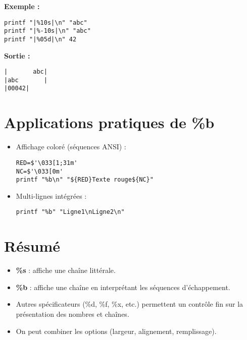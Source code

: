 \documentclass[11pt,a4paper]{article}
\begin{document}
\textbf{Exemple :}
\begin{lstlisting}
printf "|%10s|\n" "abc"
printf "|%-10s|\n" "abc"
printf "|%05d|\n" 42
\end{lstlisting}

\textbf{Sortie :}
\begin{verbatim}
|       abc|
|abc       |
|00042|
\end{verbatim}

\section*{Applications pratiques de \%b}
\begin{itemize}
  \item Affichage coloré (séquences ANSI) :
\begin{lstlisting}
RED=$'\033[1;31m'
NC=$'\033[0m'
printf "%b\n" "${RED}Texte rouge${NC}"
\end{lstlisting}

  \item Multi-lignes intégrées :
\begin{lstlisting}
printf "%b" "Ligne1\nLigne2\n"
\end{lstlisting}

\end{itemize}

\section*{Résumé}
\begin{itemize}
  \item \textbf{\%s} : affiche une chaîne littérale.
  \item \textbf{\%b} : affiche une chaîne en interprétant les séquences d’échappement.
  \item Autres spécificateurs (\%d, \%f, \%x, etc.) permettent un contrôle fin sur la présentation des nombres et chaînes.
  \item On peut combiner les options (largeur, alignement, remplissage).
\end{itemize}
\end{document}
